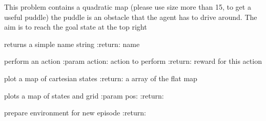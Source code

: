 \documentclass[letterpaper,10pt,english]{sphinxmanual}
\begin{document}
\begin{fulllineitems}
\label{Problems:morl_problems.MOPuddleworldProblem}
This problem contains a quadratic map (please use size more than 15, to get a useful puddle)
the puddle is an obstacle that the agent has to drive around. The aim is to reach the goal state at the top right

\begin{fulllineitems}
\label{Problems:morl_problems.MOPuddleworldProblem.name}
returns a simple name string
:return: name

\end{fulllineitems}


\begin{fulllineitems}
\label{Problems:morl_problems.MOPuddleworldProblem.play}
perform an action
:param action: action to perform
:return: reward for this action

\end{fulllineitems}


\begin{fulllineitems}
\label{Problems:morl_problems.MOPuddleworldProblem.plot_map}
plot a map of cartesian states
:return: a array of the flat map

\end{fulllineitems}


\begin{fulllineitems}
\label{Problems:morl_problems.MOPuddleworldProblem.print_map}
plots a map of states and grid
:param pos:
:return:

\end{fulllineitems}


\begin{fulllineitems}
\label{Problems:morl_problems.MOPuddleworldProblem.reset}
prepare environment for new episode
:return:


\end{fulllineitems}
\end{fulllineitems}
\end{document}
